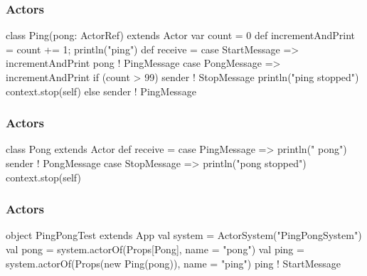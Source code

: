 \documentclass{beamer}
\newcommand{\beb}{\begin{exampleblock}}
\newcommand{\eeb}{\end{exampleblock}}
\begin{document}
\begin{frame}[fragile]
\frametitle{Actors}
\beb{}
\begin{code}
class Ping(pong: ActorRef) extends Actor {
  var count = 0
  def incrementAndPrint = {count += 1; println("ping")}
  def receive = {
    case StartMessage => 
      incrementAndPrint
      pong ! PingMessage
    case PongMessage => 
      incrementAndPrint
      if (count > 99) {
        sender ! StopMessage
        println("ping stopped")
        context.stop(self)
      } 
      else { sender ! PingMessage }
  }
}
\end{code}
\eeb
\end{frame}

\begin{frame}[fragile]
\frametitle{Actors}

\beb{}
\begin{code}
class Pong extends Actor {
  def receive = {
    case PingMessage =>
      println("  pong")
      sender ! PongMessage
    case StopMessage =>
      println("pong stopped")
      context.stop(self)
  }
}
\end{code}
\eeb
\end{frame}
\begin{frame}[fragile]
\frametitle{Actors}

\beb{}
\begin{code}

object PingPongTest extends App {
  val system = ActorSystem("PingPongSystem")
  val pong = system.actorOf(Props[Pong], 
  name = "pong")
  val ping = system.actorOf(Props(new Ping(pong)), 
  name = "ping")
  ping ! StartMessage
}
\end{code}
\eeb
\end{frame}
\end{document}
